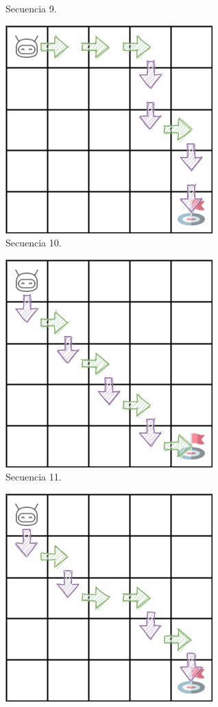 \begin{figure}
\begin{subfigure}{.35\textwidth}
        \caption{Secuencia 9.}
        \label{fig:seq9}
    \end{subfigure}
    \begin{subfigure}{.35\textwidth}
        \centering
        \includegraphics[scale=0.4]{cap5_experimentacion/images/dim5_lr0.01_ep0.7_32.png}
        \caption{Secuencia 10.}
        \label{fig:seq10}
    \end{subfigure}%
    \begin{subfigure}{.35\textwidth}
        \centering
        \includegraphics[scale=0.4]{cap5_experimentacion/images/dim5_lr0.01_ep0.9_9.png}
        \caption{Secuencia 11.}
        \label{fig:seq11}
    \end{subfigure}%
    \begin{subfigure}{.35\textwidth}
        \centering
        \includegraphics[scale=0.4]{cap5_experimentacion/images/dim5_actions_86.png}

\end{subfigure}
\end{figure}
